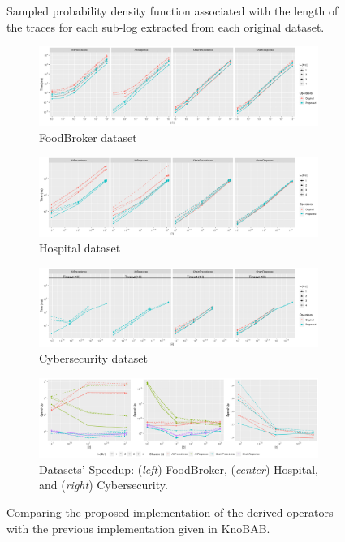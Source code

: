 \documentclass[sigconf]{acmart}
\begin{document}
\begin{figure}[!t]
\caption{Sampled probability density function associated with the length of the traces for each sub-log extracted from each original dataset.}\label{fig:PDF}
\end{figure}\begin{figure}[!p]
\centering
\begin{subfigure}{\textwidth}
\centering
\includegraphics[width=\textwidth]{images/FoodBroker.png}
\caption{FoodBroker dataset}
\end{subfigure}
\begin{subfigure}{\textwidth}
\centering
\includegraphics[width=\textwidth]{images/Hospital.png}
\caption{Hospital dataset}
\end{subfigure}
\begin{subfigure}{\textwidth}
\centering
\includegraphics[width=\textwidth]{images/Cyber.png}
\caption{Cybersecurity dataset}
\end{subfigure}
\begin{subfigure}{\textwidth}
\centering
\includegraphics[width=\textwidth]{images/Speedups.png}
\caption{Datasets' Speedup: (\textit{left}) FoodBroker, (\textit{center}) Hospital, and (\textit{right}) Cybersecurity.}
\end{subfigure}
\caption{Comparing the proposed implementation of the derived operators with the previous implementation given in KnoBAB. }\label{overallBenchmarks}
\end{figure}
\end{document}
